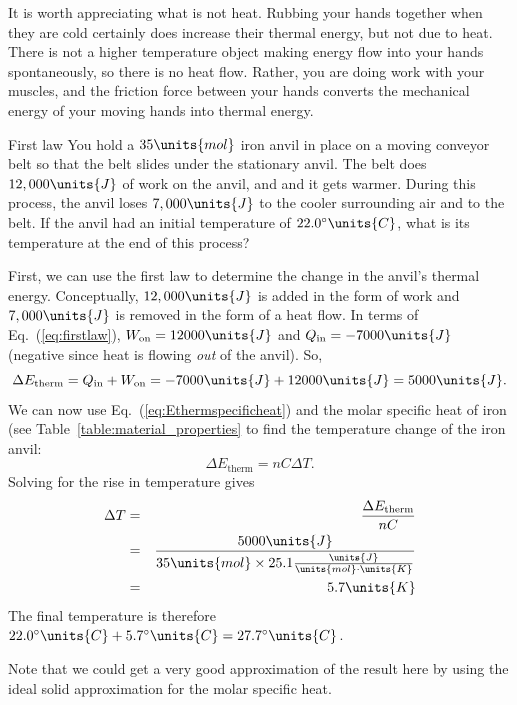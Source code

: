 It is worth appreciating what is not heat.  Rubbing your hands
together when they are cold certainly does increase their thermal
energy, but not due to heat.  There is not a higher temperature object
making energy flow into your hands spontaneously, so there is no heat
flow.  Rather, you are doing work with your muscles, and the friction
force between your hands converts the mechanical energy of your moving
hands into thermal energy.

\begin{example}{First law}
You hold a $35\units{mol}$ iron anvil in place on a moving conveyor belt
so that the belt slides under the stationary anvil. The belt does 
$12,000\units{J}$ of work on the anvil, and and it gets warmer. During 
this process, the anvil loses $7,000\units{J}$ to the cooler surrounding air 
and to the belt.  If the anvil had an initial temperature of 
$22.0^{\circ}\units{C}$, what is its temperature at the end of this 
process?

\solution
First, we can use the first law to determine the change in the anvil's
thermal energy.  Conceptually, $12,000\units{J}$ is  added in the form
of work and $7,000\units{J}$ is removed in the form of a heat flow.  In terms
of Eq.~(\ref{eq:firstlaw}), $W_\text{on}=12000\units{J}$ and 
$Q_\text{in}=-7000\units{J}$ (negative since heat is flowing {\em out}
of the anvil).  So,
\begin{equation*}
\Delta E_\text{therm} = Q_\text{in} + W_\text{on} 
     = -7000\units{J} + 12000\units{J}= 5000\units{J}.
\end{equation*}
We can now use Eq.~(\ref{eq:Ethermspecificheat}) and the molar specific
heat of iron (see Table~\ref{table:material_properties} to find the
temperature change of the iron anvil:  
\begin{equation*}
\Delta E_\text{therm} = n C \Delta T.
\end{equation*}
Solving for the rise in temperature gives
\begin{eqnarray*}
\Delta T &=& \frac{\Delta E_\text{therm}}{nC} \\
         &=& \frac{5000\units{J}}{35\units{mol} \times 25.1\frac{\units{J}}
{\units{mol} \cdot \units{K}}} \\
         &=& 5.7\units{K}
\end{eqnarray*}  
The final temperature is therefore $22.0^\circ\units{C} + 5.7^\circ\units{C} = 
27.7^\circ\units{C}$.


Note that we could get a very good approximation of the result here by using
the ideal solid approximation for the molar
specific heat.

\end{example}


